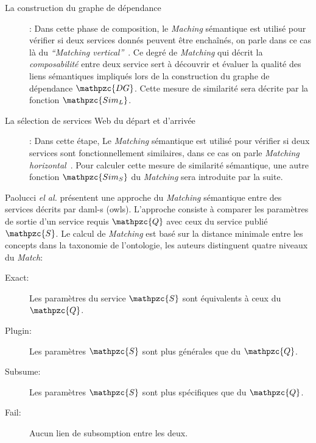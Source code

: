 \begin{description}
\item [La construction du graphe de dépendance]: Dans cette phase de
  composition, le \emph{Maching} sémantique est utilisé pour vérifier
  si deux services donnés peuvent être enchaînés, on parle dans ce cas
  là du \emph{``Matching vertical''}~\cite{temglit2012graph}. Ce degré
  de \emph{Matching} qui décrit la \emph{composabilité} entre deux
  service sert à découvrir et évaluer la qualité des liens sémantiques
  impliqués lors de la construction du graphe de dépendance
  $\mathpzc{DG}$. Cette mesure de similarité sera décrite par la
  fonction {\large $\mathpzc{Sim_L}$}.\

\item [La sélection de services Web du départ et d'arrivée]: Dans
  cette étape, Le \emph{Matching} sémantique est utilisé pour vérifier
  si deux services sont fonctionnellement similaires, dans ce cas on
  parle \emph{Matching horizontal}~\cite{temglit2012graph}. Pour
  calculer cette mesure de similarité sémantique, une autre fonction
  {\large $\mathpzc{Sim_S}$} du \emph{Matching} sera introduite par la
  suite.\medskip
\end{description}


Paolucci \emph{el al.} \cite{paolucci2002semantic} présentent une
approche du \emph{Matching} sémantique entre des services décrits par
\acrshort{daml-s} (\acrshort{owls}). L'approche consiste à comparer
les paramètres de sortie d'un service requis {\large $\mathpzc{Q}$}
avec ceux du service publié {\large $\mathpzc{S}$}. Le calcul de
\emph{Matching} est basé sur la distance minimale entre les concepts
dans la taxonomie de l'ontologie, les auteurs distinguent quatre
niveaux du \emph{Match}:

\begin{description}
\item [Exact:] Les paramètres du service {\large $\mathpzc{S}$} sont
  équivalents à ceux du {\large $\mathpzc{Q}$}.

\item [Plugin:] Les paramètres {\large $\mathpzc{S}$} sont plus
  générales que du {\large $\mathpzc{Q}$}.

\item [Subsume:] Les paramètres {\large $\mathpzc{S}$} sont plus
  spécifiques que du {\large $\mathpzc{Q}$}.

\item [Fail:] Aucun lien de subsomption entre les deux.
\end{description}

